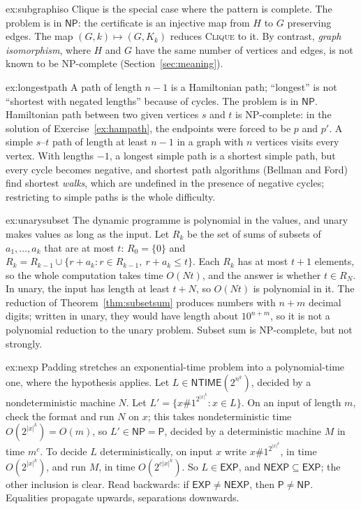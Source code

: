 \begin{solution}{ex:subgraphiso}
\idea Clique is the special case where the pattern is complete.
\writeup The problem is in $\mathsf{NP}$: the certificate is an injective map from $H$ to $G$ preserving edges. The map $(G,k)\mapsto(G,K_k)$ reduces \textup{\textsc{Clique}} to it. By contrast, \emph{graph isomorphism}, where $H$ and $G$ have the same number of vertices and edges, is not known to be NP-complete (Section~\ref{sec:meaning}).
\end{solution}

\begin{solution}{ex:longestpath}
\idea A path of length $n-1$ is a Hamiltonian path; ``longest'' is not ``shortest with negated lengths'' because of cycles.
\writeup The problem is in $\mathsf{NP}$. Hamiltonian path between two given vertices $s$ and $t$ is NP-complete: in the solution of Exercise~\ref{ex:hampath}, the endpoints were forced to be $p$ and $p'$. A simple $s$--$t$ path of length at least $n-1$ in a graph with $n$ vertices visits every vertex. With lengths $-1$, a longest simple path is a shortest simple path, but every cycle becomes negative, and shortest path algorithms (Bellman and Ford) find shortest \emph{walks}, which are undefined in the presence of negative cycles; restricting to simple paths is the whole difficulty.
\end{solution}

\begin{solution}{ex:unarysubset}
\idea The dynamic programme is polynomial in the values, and unary makes values as long as the input.
\writeup Let $R_k$ be the set of sums of subsets of $a_1,\dots,a_k$ that are at most $t$: $R_0=\{0\}$ and $R_k=R_{k-1}\cup\{r+a_k:r\in R_{k-1},\ r+a_k\le t\}$. Each $R_k$ has at most $t+1$ elements, so the whole computation takes time $O(Nt)$, and the answer is whether $t\in R_N$. In unary, the input has length at least $t+N$, so $O(Nt)$ is polynomial in it. The reduction of Theorem~\ref{thm:subsetsum} produces numbers with $n+m$ decimal digits; written in unary, they would have length about $10^{n+m}$, so it is not a polynomial reduction to the unary problem. Subset sum is NP-complete, but not strongly.
\end{solution}

\begin{solution}{ex:nexp}
\idea Padding stretches an exponential-time problem into a polynomial-time one, where the hypothesis applies.
\writeup Let $L\in\mathsf{NTIME}(2^{n^k})$, decided by a nondeterministic machine $N$. Let $L'=\{x\#1^{2^{|x|^k}}:x\in L\}$. On an input of length $m$, check the format and run $N$ on $x$; this takes nondeterministic time $O(2^{|x|^k})=O(m)$, so $L'\in\mathsf{NP}=\mathsf P$, decided by a deterministic machine $M$ in time $m^c$. To decide $L$ deterministically, on input $x$ write $x\#1^{2^{|x|^k}}$, in time $O(2^{|x|^k})$, and run $M$, in time $O(2^{c|x|^k})$. So $L\in\mathsf{EXP}$, and $\mathsf{NEXP}\subseteq\mathsf{EXP}$; the other inclusion is clear. Read backwards: if $\mathsf{EXP}\ne\mathsf{NEXP}$, then $\mathsf P\ne\mathsf{NP}$. Equalities propagate upwards, separations downwards.
\end{solution}

